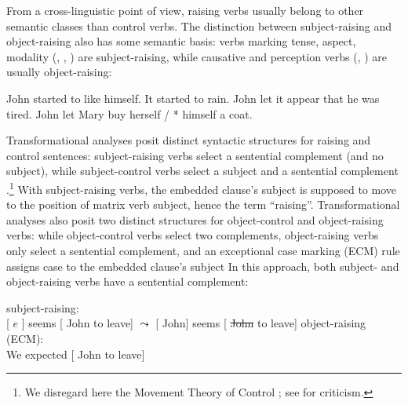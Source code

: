 From a cross-linguistic point of view, raising verbs usually belong to other semantic classes than
control verbs. The distinction between subject-raising and object-raising also has some semantic
basis: verbs marking tense, aspect, modality (, , ) are
subject-raising, while causative and perception verbs (, ) are usually
object-raising:

\eal
\ex John started to like himself.
\ex It started to rain.
\ex John let it appear that he was tired.
\ex John let Mary buy herself / * himself a coat.
\zl
	

Transformational analyses posit distinct syntactic structures for raising and control sentences:
subject-raising verbs select a sentential complement (and no subject), while subject-control verbs
select a subject and a sentential complement \parencites[\iaddpages]{Postal1974}[\iaddpages]{Chomsky81a}.\footnote{We disregard here the Movement Theory of Control \citep{Hornstein99a-u}; see  for criticism.}
With subject-raising
verbs, the embedded clause's subject is supposed to move to the position of matrix verb subject,
hence the  term ``raising''. Transformational analyses also posit two distinct structures for object-control and
object-raising verbs: while object-control verbs select two complements, object-raising verbs only
select a sentential complement, and an exceptional case marking (ECM) rule assigns case to the
embedded clause's subject%
In this approach, both subject- and object-raising verbs have a sentential complement:
	
\eal
\ex subject-raising:\\
{}[ $e$ ] seems [ John to leave] 
$\leadsto$  
{}[ John] seems [ \st{John} to leave]
\ex object-raising (ECM):\\
We expected [ John to leave] 	
\zl

